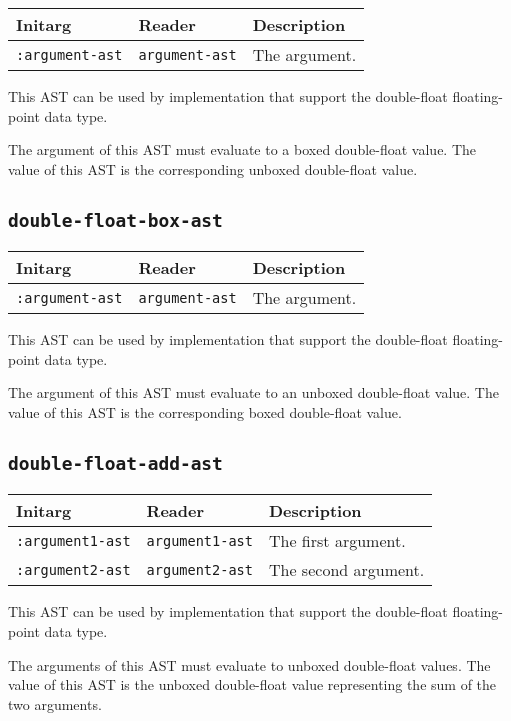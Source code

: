 \begin{tabular}{|l|l|l|}
\hline
Initarg & Reader & Description\\
\hline\hline
\texttt{:argument-ast} & \texttt{argument-ast} & The argument.\\
\hline
\end{tabular}

This AST can be used by implementation that support the double-float
floating-point data type.  

The argument of this AST must evaluate to a boxed double-float value.
The value of this AST is the corresponding unboxed double-float value.

\subsection{\texttt{double-float-box-ast}}
\label{sec-ast-double-float-box}

\begin{tabular}{|l|l|l|}
\hline
Initarg & Reader & Description\\
\hline\hline
\texttt{:argument-ast} & \texttt{argument-ast} & The argument.\\
\hline
\end{tabular}

This AST can be used by implementation that support the double-float
floating-point data type.  

The argument of this AST must evaluate to an unboxed double-float
value.  The value of this AST is the corresponding boxed double-float
value.

\subsection{\texttt{double-float-add-ast}}
\label{sec-ast-double-float-add}

\begin{tabular}{|l|l|l|}
\hline
Initarg & Reader & Description\\
\hline\hline
\texttt{:argument1-ast} & \texttt{argument1-ast} & The first argument.\\
\hline
\texttt{:argument2-ast} & \texttt{argument2-ast} & The second argument.\\
\hline
\end{tabular}

This AST can be used by implementation that support the double-float
floating-point data type.  

The arguments of this AST must evaluate to unboxed double-float
values.  The value of this AST is the unboxed double-float value
representing the sum of the two arguments.

